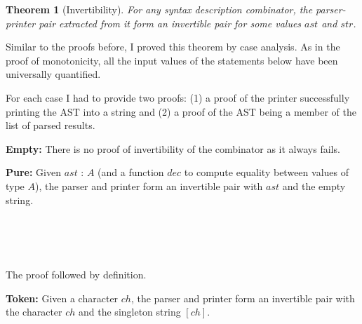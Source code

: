 \documentclass[12pt,a4paper,twoside,openright]{report}
\newcommand{\F}{\AgdaFunction}
\newtheorem{theorem}{Theorem}[section]
\begin{document}
\begin{theorem}[Invertibility]
For any syntax description combinator, the parser-printer pair extracted from it form an invertible pair for some values {$ast$} and {$str$}.
\end{theorem}

Similar to the proofs before, I proved this theorem by case analysis. As in the proof of monotonicity, all the input values of the statements below have been universally quantified.

For each case I had to provide two proofs: (1) a proof of the printer successfully printing the AST into a string and (2) a proof of the AST being a member of the list of parsed results.

{\bf Empty:}
There is no proof of invertibility of the \F{empty} combinator as it always fails.

{\bf Pure:} Given {$ast$} : {$A$} (and a function {$dec$} to compute equality between values of type {$A$}), the \F{pure} parser and printer form an invertible pair with {$ast$} and the empty string.

\begin{code}
\> \AgdaSymbol{:} \>[18]\AgdaSymbol{\{} \AgdaSymbol{:} \AgdaSymbol{\}}  \AgdaSymbol{(} \AgdaSymbol{:} \AgdaSymbol{)}  \<[43]%
\>[43]\AgdaSymbol{(} \AgdaSymbol{:}  \AgdaSymbol{(} \AgdaSymbol{\{} \AgdaSymbol{=} \AgdaSymbol{\}))} \<%
\\
\>[2]\<[18]%
\>[18]  \AgdaSymbol{=}   \<%
\\
\>[18]\<[22]%
\>[22] \AgdaSymbol{=}   \<%
\\
\>[0]\<[18]%
\>[18] \<[22]%
\>[22]       \AgdaInductiveConstructor{[]} \<%
\end{code}

The proof followed by definition.

{\bf Token:} Given a character {$ch$}, the \F{token} parser and printer form an invertible pair with the character {$ch$} and the singleton string {$[ ch ]$}.
\end{document}
